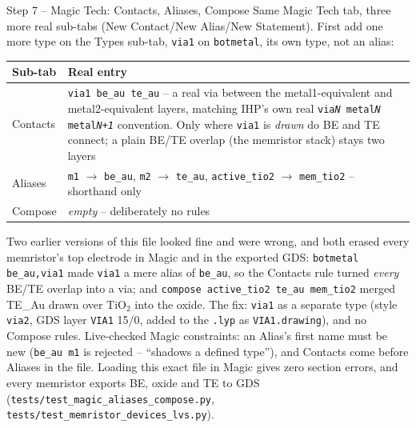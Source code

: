 \documentclass[aspectratio=169]{beamer}
\begin{document}
\begin{frame}[fragile]{Step 7 -- Magic Tech: Contacts, Aliases, Compose}
Same Magic Tech tab, three more real sub-tabs (New Contact/New
Alias/New Statement). First add one more type on the Types sub-tab,
\texttt{via1} on \texttt{botmetal}, its own type, not an alias:
\begin{center}
\begin{tabularx}{\textwidth}{lX}
\toprule
Sub-tab & Real entry \\
\midrule
Contacts & \texttt{via1 be\_au te\_au} -- a real via between the
  metal1-equivalent and metal2-equivalent layers, matching IHP's own
  real \texttt{via\emph{N} metal\emph{N} metal\emph{N+1}} convention.
  Only where \texttt{via1} is \emph{drawn} do BE and TE connect; a
  plain BE/TE overlap (the memristor stack) stays two layers \\
Aliases & \texttt{m1} $\to$ \texttt{be\_au}, \texttt{m2} $\to$
  \texttt{te\_au}, \texttt{active\_tio2} $\to$ \texttt{mem\_tio2} --
  shorthand only \\
Compose & \emph{empty} -- deliberately no rules \\
\bottomrule
\end{tabularx}
\end{center}
\footnotesize
Two earlier versions of this file looked fine and were wrong, and both
erased every memristor's top electrode in Magic and in the exported
GDS: \texttt{botmetal be\_au,via1} made \texttt{via1} a mere alias of
\texttt{be\_au}, so the Contacts rule turned \emph{every} BE/TE overlap
into a via; and \texttt{compose active\_tio2 te\_au mem\_tio2} merged
TE\_Au drawn over TiO$_2$ into the oxide. The fix: \texttt{via1} as a
separate type (style \texttt{via2}, GDS layer \texttt{VIA1} 15/0, added
to the \texttt{.lyp} as \texttt{VIA1.drawing}), and no Compose rules.
Live-checked Magic constraints: an Alias's first name must be new
(\texttt{be\_au m1} is rejected -- ``shadows a defined type''), and
Contacts come before Aliases in the file. Loading this exact file in
Magic gives zero section errors, and every memristor exports BE, oxide
and TE to GDS (\texttt{tests/test\_magic\_aliases\_compose.py},
\texttt{tests/test\_memristor\_devices\_lvs.py}).
\end{frame}
\end{document}
